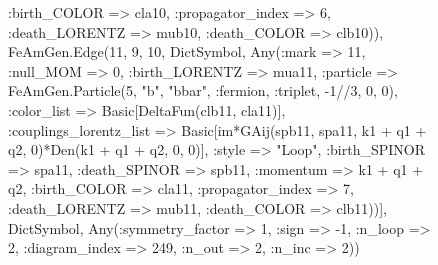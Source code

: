 \documentclass{revtex4}
\begin{document}
\begin{figure}[!htb]
\begin{center}
{:birth_COLOR => cla10, :propagator_index => 6, :death_LORENTZ => mub10, :death_COLOR => clb10)), FeAmGen.Edge(11, 9, 10, Dict{Symbol, Any}(:mark => 11, :null_MOM => 0, :birth_LORENTZ => mua11, :particle => FeAmGen.Particle(5, "b", "bbar", :fermion, :triplet, -1//3, 0, 0), :color_list => Basic[DeltaFun(clb11, cla11)], :couplings_lorentz_list => Basic[im*GAij(spb11, spa11, k1 + q1 + q2, 0)*Den(k1 + q1 + q2, 0, 0)], :style => "Loop", :birth_SPINOR => spa11, :death_SPINOR => spb11, :momentum => k1 + q1 + q2, :birth_COLOR => cla11, :propagator_index => 7, :death_LORENTZ => mub11, :death_COLOR => clb11))], Dict{Symbol, Any}(:symmetry_factor => 1, :sign => -1, :n_loop => 2, :diagram_index => 249, :n_out => 2, :n_inc => 2)) 
}
\end{center}
\end{figure}
\end{document}
